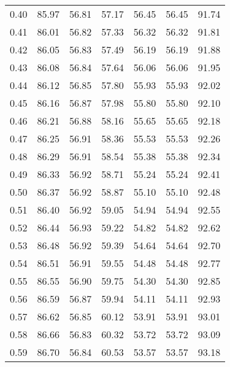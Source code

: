 \begin{tabular}{|c|c|c|c|c|c|c|}
      0.40 &     85.97 &     56.81 &      57.17 &   56.45 &      56.45 &         91.74 \\
      0.41 &     86.01 &     56.82 &      57.33 &   56.32 &      56.32 &         91.81 \\
      0.42 &     86.05 &     56.83 &      57.49 &   56.19 &      56.19 &         91.88 \\
      0.43 &     86.08 &     56.84 &      57.64 &   56.06 &      56.06 &         91.95 \\
      0.44 &     86.12 &     56.85 &      57.80 &   55.93 &      55.93 &         92.02 \\
      0.45 &     86.16 &     56.87 &      57.98 &   55.80 &      55.80 &         92.10 \\
      0.46 &     86.21 &     56.88 &      58.16 &   55.65 &      55.65 &         92.18 \\
      0.47 &     86.25 &     56.91 &      58.36 &   55.53 &      55.53 &         92.26 \\
      0.48 &     86.29 &     56.91 &      58.54 &   55.38 &      55.38 &         92.34 \\
      0.49 &     86.33 &     56.92 &      58.71 &   55.24 &      55.24 &         92.41 \\
      0.50 &     86.37 &     56.92 &      58.87 &   55.10 &      55.10 &         92.48 \\
      0.51 &     86.40 &     56.92 &      59.05 &   54.94 &      54.94 &         92.55 \\
      0.52 &     86.44 &     56.93 &      59.22 &   54.82 &      54.82 &         92.62 \\
      0.53 &     86.48 &     56.92 &      59.39 &   54.64 &      54.64 &         92.70 \\
      0.54 &     86.51 &     56.91 &      59.55 &   54.48 &      54.48 &         92.77 \\
      0.55 &     86.55 &     56.90 &      59.75 &   54.30 &      54.30 &         92.85 \\
      0.56 &     86.59 &     56.87 &      59.94 &   54.11 &      54.11 &         92.93 \\
      0.57 &     86.62 &     56.85 &      60.12 &   53.91 &      53.91 &         93.01 \\
      0.58 &     86.66 &     56.83 &      60.32 &   53.72 &      53.72 &         93.09 \\
      0.59 &     86.70 &     56.84 &      60.53 &   53.57 &      53.57 &         93.18 \\

\end{tabular}
